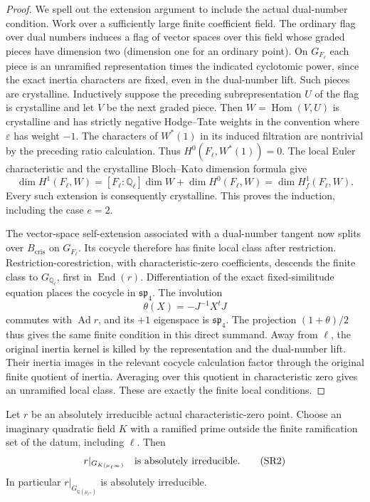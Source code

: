 \begin{proof}
We spell out the extension argument to include the actual
dual-number condition. Work over a sufficiently large finite
coefficient field. The ordinary flag over dual numbers
induces a flag of vector spaces over this field whose graded
pieces have dimension two (dimension one for an ordinary
point). On \(G_{F_\ell}\) each piece is an unramified
representation times the indicated cyclotomic power, since
the exact inertia characters are fixed, even in the
dual-number lift. Such pieces are crystalline. Inductively
suppose the preceding subrepresentation \(U\) of the flag
is crystalline and let \(V\) be the next graded piece.
Then \(W=\operatorname{Hom}(V,U)\) is crystalline and has
strictly negative Hodge--Tate weights in the convention
where \(\varepsilon\) has weight \(-1\).
The characters of \(W^*(1)\) in its induced filtration
are nontrivial by the preceding ratio calculation.
Thus \(H^0(F_\ell,W^*(1))=0\).
The local Euler characteristic and the crystalline
Bloch--Kato dimension formula give
\[
 \dim H^1(F_\ell,W)=
 [F_\ell:\mathbb Q_\ell]\dim W+\dim H^0(F_\ell,W)
 =\dim H^1_f(F_\ell,W).
\]
Every such extension is consequently crystalline.
This proves the induction, including the case \(e=2\).

The vector-space self-extension associated with a
dual-number tangent now splits over \(B_{\mathrm{cris}}\)
on \(G_{F_\ell}\). Its cocycle therefore has finite
local class after restriction. Restriction-corestriction,
with characteristic-zero coefficients, descends the
finite class to \(G_{\mathbb Q_\ell}\), first in
\(\operatorname{End}(r)\). Differentiation of the exact
fixed-similitude equation places the cocycle in
\(\mathfrak{sp}_4\). The involution
\[
 \theta(X)=-J^{-1}X^tJ
\]
commutes with \(\operatorname{Ad}r\), and its \(+1\)
eigenspace is \(\mathfrak{sp}_4\). The projection
\((1+\theta)/2\) thus gives the same finite condition
in this direct summand. Away from \(\ell\), the original
inertia kernel is killed by the representation and the
dual-number lift. Their inertia images in the relevant
cocycle calculation factor through the original finite
quotient of inertia. Averaging over this quotient in
characteristic zero gives an unramified local class.
These are exactly the finite local conditions.
\end{proof}

\begin{lemma}
\label{lem:rh-symplectic-cyclotomic-irreducibility}
Let \(r\) be an absolutely irreducible actual characteristic-zero
point. Choose an imaginary quadratic field \(K\) with a ramified
prime outside the finite ramification set of the datum, including
\(\ell\). Then
\[
 r|_{G_{K(\mu_{\ell^\infty})}}
 \quad\hbox{is absolutely irreducible}.
 \tag{SR2}
\]
In particular \(r|_{G_{\mathbb Q(\mu_{\ell^\infty})}}\)
is absolutely irreducible.
\end{lemma}

